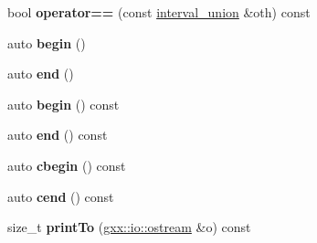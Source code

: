 \begin{DoxyCompactItemize}
\item 
bool {\bfseries operator==} (const \hyperlink{structgxx_1_1math_1_1interval__union}{interval\+\_\+union} \&oth) const \hypertarget{structgxx_1_1math_1_1interval__union_aeefb94cefa7f50dc2e591b44d6a2d641}{}\label{structgxx_1_1math_1_1interval__union_aeefb94cefa7f50dc2e591b44d6a2d641}

\item 
auto {\bfseries begin} ()\hypertarget{structgxx_1_1math_1_1interval__union_ad03a6cc8150619ac1230b3311756e477}{}\label{structgxx_1_1math_1_1interval__union_ad03a6cc8150619ac1230b3311756e477}

\item 
auto {\bfseries end} ()\hypertarget{structgxx_1_1math_1_1interval__union_a8ba9cf5f3db5b2be41be1447156b6c8c}{}\label{structgxx_1_1math_1_1interval__union_a8ba9cf5f3db5b2be41be1447156b6c8c}

\item 
auto {\bfseries begin} () const \hypertarget{structgxx_1_1math_1_1interval__union_a42e098ef562df5cd98fbfef6620bf51e}{}\label{structgxx_1_1math_1_1interval__union_a42e098ef562df5cd98fbfef6620bf51e}

\item 
auto {\bfseries end} () const \hypertarget{structgxx_1_1math_1_1interval__union_a35bfb5414c13fa074bd73cc363d1f001}{}\label{structgxx_1_1math_1_1interval__union_a35bfb5414c13fa074bd73cc363d1f001}

\item 
auto {\bfseries cbegin} () const \hypertarget{structgxx_1_1math_1_1interval__union_a7bbb42c10683eefc1f0e2a38f2ed6d7c}{}\label{structgxx_1_1math_1_1interval__union_a7bbb42c10683eefc1f0e2a38f2ed6d7c}

\item 
auto {\bfseries cend} () const \hypertarget{structgxx_1_1math_1_1interval__union_a437a2dac26f71f920d7af840911e25cc}{}\label{structgxx_1_1math_1_1interval__union_a437a2dac26f71f920d7af840911e25cc}

\item 
size\+\_\+t {\bfseries print\+To} (\hyperlink{classgxx_1_1io_1_1ostream}{gxx\+::io\+::ostream} \&o) const \hypertarget{structgxx_1_1math_1_1interval__union_acee6ed162183e4774265bc1df75bda37}{}\label{structgxx_1_1math_1_1interval__union_acee6ed162183e4774265bc1df75bda37}

\end{DoxyCompactItemize}

